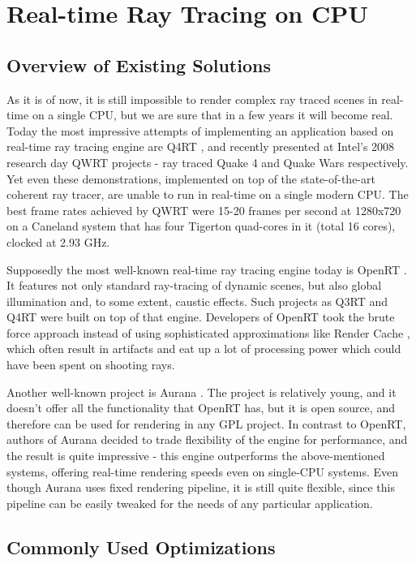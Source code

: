 \documentclass{article}
\begin{document}
\newpage
\section{Real-time Ray Tracing on CPU}

\subsection{Overview of Existing Solutions}
As it is of now, it is still impossible to render complex ray traced scenes in real-time on a single CPU, but we are sure that in a few years it will become real. Today the most impressive attempts of implementing an application based on real-time ray tracing engine are Q4RT \cite{q4rt}, and recently presented at Intel's 2008 research day QWRT \cite{qwrt} projects - ray traced Quake 4 and Quake Wars respectively. Yet even these demonstrations, implemented on top of the state-of-the-art coherent ray tracer, are unable to run in real-time on a single modern CPU. The best frame rates achieved by QWRT were 15-20 frames per second at 1280x720 on a Caneland system that has four Tigerton quad-cores in it (total 16 cores), clocked at 2.93 GHz.

Supposedly the most well-known real-time ray tracing engine today is OpenRT \cite{openrt}. It features not only standard ray-tracing of dynamic scenes, but also global illumination and, to some extent, caustic effects. Such projects as Q3RT \cite{q3rt} and Q4RT \cite{q4rt} were built on top of that engine. Developers of OpenRT took the brute force approach instead of using sophisticated approximations like Render Cache \cite{walter99}, which often result in artifacts and eat up a lot of processing power which could have been spent on shooting rays. 

Another well-known project is Aurana \cite{aurana}. The project is relatively young, and it doesn't offer all the functionality that OpenRT has, but it is open source, and therefore can be used for rendering in any GPL project. In contrast to OpenRT, authors of Aurana decided to trade flexibility of the engine for performance, and the result is quite impressive - this engine outperforms the above-mentioned systems, offering real-time rendering speeds even on single-CPU systems. Even though Aurana uses fixed rendering pipeline, it is still quite flexible, since this pipeline can be easily tweaked for the needs of any particular application.

\subsection{Commonly Used Optimizations}
\end{document}
